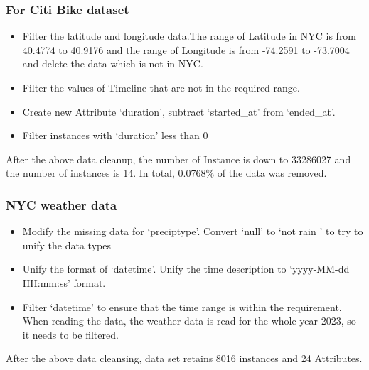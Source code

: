 \documentclass[11pt]{article}
\begin{document}
\subsubsection{For Citi Bike dataset}
\begin{itemize}
    \item Filter the latitude and longitude data\cite{latlong}.The range of Latitude in NYC is from 40.4774 to 40.9176 and the range of Longitude is from -74.2591 to -73.7004 and delete the data which is not in NYC.
    \item Filter the values of Timeline that are not in the required range.
    \item Create new Attribute `duration', subtract `started\_at' from `ended\_at'.
    \item Filter instances with `duration' less than 0
\end{itemize}
After the above data cleanup, the number of Instance is down to 33286027 and the number of instances is 14. In total, 0.0768\% of the data was removed.

\subsubsection{NYC weather data}
\begin{itemize}
    \item Modify the missing data for `preciptype'. Convert `null' to `not rain ' to try to unify the data types
    \item Unify the format of `datetime'. Unify the time description to `yyyy-MM-dd HH:mm:ss' format.
    \item Filter `datetime' to ensure that the time range is within the requirement. When reading the data, the weather data is read for the whole year 2023, so it needs to be filtered.
\end{itemize}
After the above data cleansing, data set retains 8016 instances and 24 Attributes.
\end{document}
